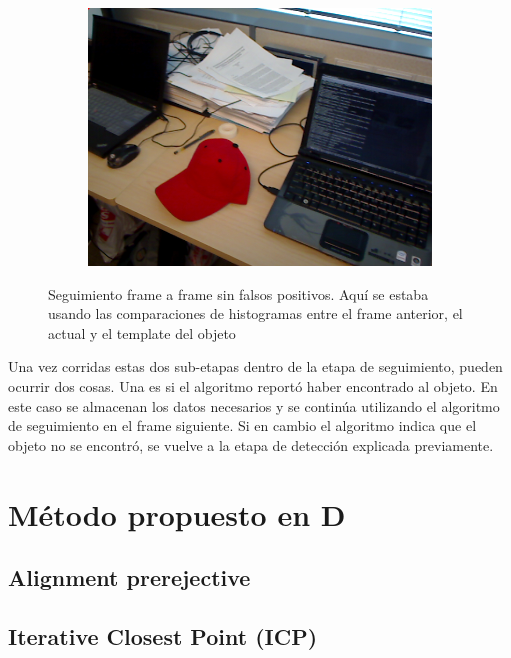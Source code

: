 \begin{figure}
\begin{subfigure}[b]{0.3\textwidth}
		\includegraphics[width=\textwidth]{img/seguimiento_frame_template/frame_template-desk_1-coffee_mug_5-frame_34.png}
	\end{subfigure}
	
	\caption{Seguimiento frame a frame sin falsos positivos. Aquí se estaba usando las comparaciones de histogramas entre el frame anterior, el actual y el template del objeto}
	\label{frame_template_tracking}
\end{figure}

Una vez corridas estas dos sub-etapas dentro de la etapa de seguimiento, pueden ocurrir dos cosas. Una es si el algoritmo reportó haber encontrado al objeto. En este caso se almacenan los datos necesarios y se continúa utilizando el algoritmo de seguimiento en el frame siguiente. Si en cambio el algoritmo indica que el objeto no se encontró, se vuelve a la etapa de detección explicada previamente.



\section{Método propuesto en D}
\subsection{Alignment prerejective}\label{alignment_prerejective}

\subsection{Iterative Closest Point (ICP)}\label{ICP}



